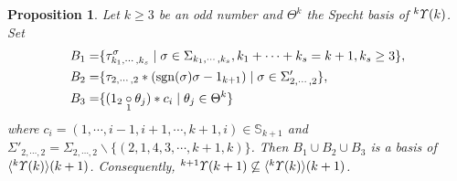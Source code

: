\documentclass{amsart}
\newtheorem{prop}[thm]{Proposition}
\theoremstyle{definition}
\theoremstyle{remark}
\numberwithin{equation}{section}
\def\S{\mathbb{S}}
\def\sgn{{\rm sgn}}
\newcommand{\lr}[1]{\langle #1 \rangle}
\newcommand{\ucr}[1]{\underset{#1}{\circ}}
\newcommand{\up}[1]{{^{#1}{\it \!\Upsilon}}}
\def \S{\mathbb{S}}
\begin{document}
\begin{prop}
\label{yypro3.9}
Let $k\ge 3$ be an odd number and $\Theta^{k}$ the 
Specht basis of $\up{k}(k)$. Set 
\begin{align*}
B_1=& \{\tau_{k_1, \cdots, k_s}^\sigma\mid 
\sigma\in \Sigma_{k_1, \cdots, k_s}, k_1+\cdots+k_s=k+1, k_s\ge 3\}, \\
B_2=& \{\tau_{2, \cdots, 2}\ast (\sgn(\sigma)\sigma-1_{k+1})\mid 
\sigma\in \Sigma'_{2, \cdots, 2} \},\\
B_3=& \{(1_2\ucr{1}\theta_j)\ast c_i\mid \theta_j\in \Theta^{k}\}
\end{align*}
where $c_i=(1, \cdots, i-1, i+1, \cdots, k+1, i)\in \S_{k+1}$
and $\Sigma'_{2,\cdots,2}=\Sigma_{2, \cdots, 2}\backslash 
\{(2, 1, 4, 3, \cdots, k+1, k)\}$. 
Then $B_1\cup B_2 \cup B_3$ is a basis of $\lr{\up{k}(k)}(k+1)$.
Consequently,  $\up{k+1}(k+1)\not\subseteq\lr{\up{k}(k)}(k+1)$. 
\end{prop}
\end{document}
